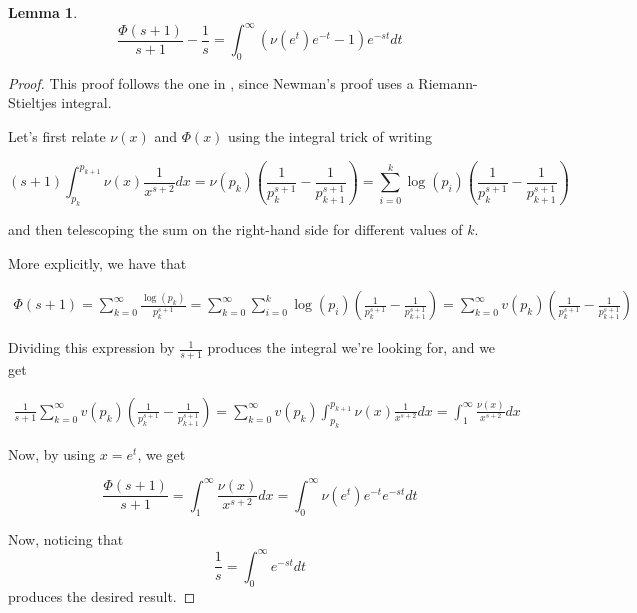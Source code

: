 \documentclass{article}
\theoremstyle{definition}
\newtheorem{lemma}[theorem]{Lemma}
\begin{document}
\begin{lemma}\label{lem:newman_v}
    \[ \frac{\Phi(s + 1)}{s + 1} - \frac{1}{s} = \int_{0}^{\infty} (\nu(e^{t}) e^{-t} - 1) e^{-st} dt \]
\end{lemma}
\begin{proof}
    This proof follows the one in \cite{noauthor_aops_nodate}, since Newman's proof 
    uses a Riemann-Stieltjes integral.

    Let's first relate $ \nu(x) $ and $ \Phi(x) $ using the integral trick
    of writing

    \[ ( s + 1) \int_{p_{k}}^{p_{k+1}} \nu(x) \frac{1}{x^{s+2}} dx = \nu(p_{k}) (\frac{1}{p_{k}^{s+1}} - \frac{1}{p_{k+1}^{s+1}}) =  
    \sum_{i = 0}^{k} \log (p_{i}) (\frac{1}{p_{k}^{s+1}} - \frac{1}{p_{k+1}^{s+1}}) \] 

    and then telescoping the sum on the right-hand side for different values of $ k $.

    More explicitly, we have that

    \begin{align*}
        \Phi( s + 1) = \sum_{k = 0}^{\infty} \frac{\log (p_{k})}{p_{k}^{s + 1}} = 
        \sum_{k = 0}^{\infty}  \sum_{i = 0}^{k} \log (p_{i}) (\frac{1}{p_{k}^{s+1}} - \frac{1}{p_{k+1}^{s+1}}) = \sum_{k = 0}^{\infty} v(p_{k}) (\frac{1}{p_{k}^{s+1}} - \frac{1}{p_{k+1}^{s+1}})  
    \end{align*}

    Dividing this expression by $ \frac{1}{s + 1} $ produces the integral we're looking for, and we get

    \begin{align*}
        \frac{1}{s + 1} \sum_{k = 0}^{\infty} v(p_{k}) (\frac{1}{p_{k}^{s+1}} - \frac{1}{p_{k+1}^{s+1}}) = \sum_{k = 0}^{\infty} v(p_{k}) \int_{p_{k}}^{p_{k+1}} \nu(x) \frac{1}{x^{s+2}} dx
        = \int_{1}^{\infty} \frac{\nu(x)}{x^{s + 2}} dx 
    \end{align*}

    Now, by using $ x = e^{t} $, we get

    \[ \frac{\Phi(s + 1)}{s + 1} = \int_{1}^{\infty} \frac{\nu(x)}{x^{s + 2}} dx = 
    \int_{0}^{\infty} \nu(e^{t}) e^{-t} e^{-st} dt\]
    
    Now, noticing that \[ \frac{1}{s} = \int_{0}^{\infty} e^{-st} dt \] produces the desired result.


\end{proof}
\end{document}
